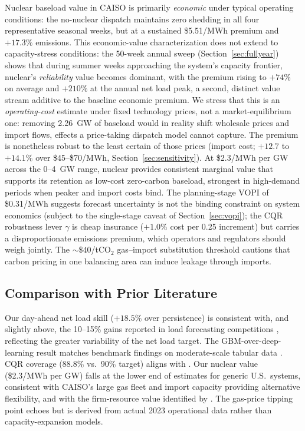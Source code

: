 \documentclass[preprint,12pt,authoryear]{elsarticle}
\begin{document}
Nuclear baseload value in CAISO is primarily \emph{economic} under typical operating conditions: the no-nuclear dispatch maintains zero shedding in all four representative seasonal weeks, but at a sustained \$5.51/MWh premium and $+17.3\%$ emissions. This economic-value characterization does not extend to capacity-stress conditions: the 50-week annual sweep (Section~\ref{sec:fullyear}) shows that during summer weeks approaching the system's capacity frontier, nuclear's \emph{reliability} value becomes dominant, with the premium rising to $+74\%$ on average and $+210\%$ at the annual net load peak, a second, distinct value stream additive to the baseline economic premium. We stress that this is an \emph{operating-cost} estimate under fixed technology prices, not a market-equilibrium one: removing 2.26~GW of baseload would in reality shift wholesale prices and import flows, effects a price-taking dispatch model cannot capture. The premium is nonetheless robust to the least certain of those prices (import cost; $+12.7$ to $+14.1\%$ over \$45--\$70/MWh, Section~\ref{sec:sensitivity}). At \$2.3/MWh per GW across the 0--4~GW range, nuclear provides consistent marginal value that supports its retention as low-cost zero-carbon baseload, strongest in high-demand periods when peaker and import costs bind. The planning-stage VOPI of \$0.31/MWh suggests forecast uncertainty is not the binding constraint on system economics (subject to the single-stage caveat of Section~\ref{sec:vopi}); the CQR robustness lever $\gamma$ is cheap insurance ($+1.0\%$ cost per 0.25 increment) but carries a disproportionate emissions premium, which operators and regulators should weigh jointly. The ${\sim}\$40$/tCO$_2$ gas--import substitution threshold cautions that carbon pricing in one balancing area can induce leakage through imports.

\subsection{Comparison with Prior Literature}

Our day-ahead net load skill ($+18.5\%$ over persistence) is consistent with, and slightly above, the 10--15\% gains reported in load forecasting competitions \citep{hong2016,hong2020review}, reflecting the greater variability of the net load target. The GBM-over-deep-learning result matches benchmark findings on moderate-scale tabular data \citep{hertel2022,grinsztajn2022}. CQR coverage (88.8\% vs.\ 90\% target) aligns with \citet{romano2019}. Our nuclear value (\$2.3/MWh per GW) falls at the lower end of \citet{jenkins2018} estimates for generic U.S.\ systems, consistent with CAISO's large gas fleet and import capacity providing alternative flexibility, and with the firm-resource value identified by \citet{sepulveda2018}. The gas-price tipping point echoes \citet{bistline2023} but is derived from actual 2023 operational data rather than capacity-expansion models.
\end{document}
